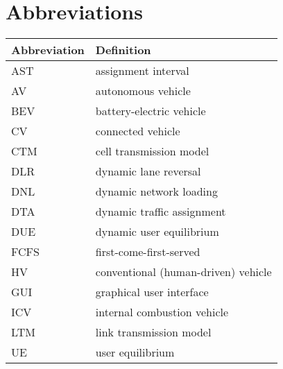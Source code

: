 \chapter{Abbreviations}

\begin{longtable}{ll}
\hline
Abbreviation & Definition\\\hline
\endhead
AST & assignment interval\\
AV & autonomous vehicle\\
BEV & battery-electric vehicle\\
CV & connected vehicle \\
CTM &  cell transmission model~\cite{daganzo1994cell, daganzo1995cell}\\
DLR & dynamic lane reversal~\cite{levin2016cell, duell2016system} \\
DNL & dynamic network loading~\cite{chiu2011dynamic} \\
DTA & dynamic traffic assignment~\cite{chiu2011dynamic} \\
DUE & dynamic user equilibrium~\cite{wardrop1952road, chiu2011dynamic} \\
FCFS & first-come-first-served~\cite{fajardo2011automated}\\
HV & conventional (human-driven) vehicle\\
GUI & graphical user interface\\
ICV & internal combustion vehicle\\
LTM & link transmission model~\cite{yperman2005link, yperman2007link}\\
UE & user equilibrium~\cite{wardrop1952road}\\
\hline
\end{longtable}